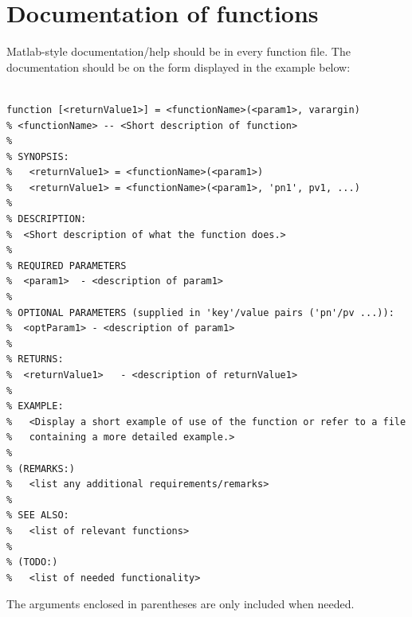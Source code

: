 \documentclass[11pt,twoside,UKenglish]{scrartcl}
\begin{document}
\section{Documentation of functions}


Matlab-style documentation/help should be in every function file. The
documentation should be on the form displayed in the example below: 

\begin{verbatim}

function [<returnValue1>] = <functionName>(<param1>, varargin)
% <functionName> -- <Short description of function>
%
% SYNOPSIS:
%   <returnValue1> = <functionName>(<param1>)
%   <returnValue1> = <functionName>(<param1>, 'pn1', pv1, ...)
%
% DESCRIPTION:  
%  <Short description of what the function does.>
%                
% REQUIRED PARAMETERS
%  <param1>  - <description of param1> 
% 
% OPTIONAL PARAMETERS (supplied in 'key'/value pairs ('pn'/pv ...)):
%  <optParam1> - <description of param1> 
%
% RETURNS:
%  <returnValue1>   - <description of returnValue1>
%
% EXAMPLE:
%   <Display a short example of use of the function or refer to a file
%   containing a more detailed example.> 
%
% (REMARKS:)
%   <list any additional requirements/remarks>
%
% SEE ALSO:
%   <list of relevant functions>
%                                     
% (TODO:)
%   <list of needed functionality>
\end{verbatim}
The arguments enclosed in parentheses are only included when needed. 
\end{document}
